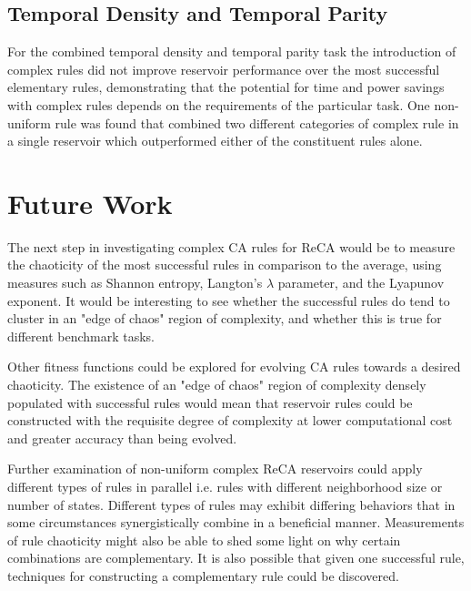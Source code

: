 \documentclass{elsarticle}
\begin{document}
\begin{multicols}{2}
\begin{figure}[H]
		\label{repeat}
	\end{figure}
	
	\subsection{Temporal Density and Temporal Parity}
	For the combined temporal density and temporal parity task the introduction of 
	complex rules did not improve reservoir performance over the most successful 
	elementary rules, demonstrating that the potential for time and power savings 
	with complex rules depends on the requirements of the particular task. One 
	non-uniform rule was found that combined two different categories of complex 
	rule in a single reservoir which outperformed either of the constituent rules 
	alone.
	
	
	
	
	\iffalse
	
	\section{Future Work}\label{future_work}
	The next step in investigating complex CA rules for ReCA would be to measure 
	the chaoticity of the most successful rules in comparison to the average, using 
	measures such as Shannon entropy, Langton's $\lambda$ parameter, and the 
	Lyapunov exponent. It would be interesting to see whether the successful rules 
	do tend to cluster in an "edge of chaos" region of complexity, and whether this
	is true for different benchmark tasks. \par Other fitness functions could be 
	explored for evolving CA rules towards a desired chaoticity. The existence of 
	an "edge of chaos" region of complexity densely populated with successful rules 
	would mean that reservoir rules could be constructed with the requisite degree 
	of complexity at lower computational cost and greater accuracy than being 
	evolved.  \par Further examination of non-uniform complex ReCA reservoirs could 
	apply different types of rules in parallel i.e.  rules with different 
	neighborhood size or number of states.  Different types of rules may exhibit 
	differing behaviors that in some circumstances synergistically combine in a 
	beneficial manner.  Measurements of rule chaoticity might also be able to shed 
	some light on why certain combinations are complementary. It is also possible 
	that given one successful rule, techniques for constructing a complementary 
	rule could be discovered.
	

\end{multicols}
\end{document}
